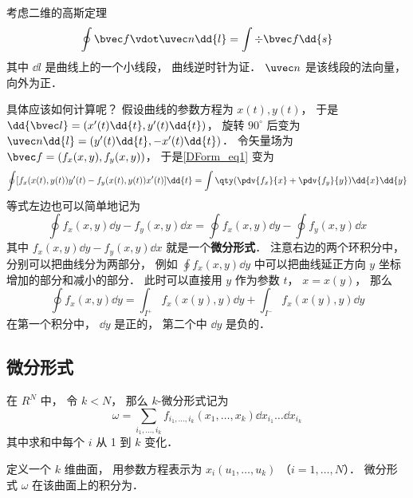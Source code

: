 
\begin{issues}
\issueDraft
\end{issues}


考虑二维的高斯定理
\begin{equation}\label{DForm_eq1}
\oint \bvec f \vdot \uvec n \dd{l} = \int \div \bvec f \dd{s}
\end{equation}
其中 $\dd{l}$ 是曲线上的一个小线段， 曲线逆时针为证． $\uvec n$ 是该线段的法向量， 向外为正．

具体应该如何计算呢？ 假设曲线的参数方程为 $x(t), y(t)$， 于是 $\dd{\bvec l} = (x'(t)\dd{t}, y'(t)\dd{t})$， 旋转 $90^\circ$ 后变为 $\uvec n \dd{l} = (y'(t)\dd{t}, -x'(t)\dd{t})$． 令矢量场为 $\bvec f = (f_x(x,y), f_y(x,y))$， 于是\autoref{DForm_eq1} 变为
\begin{equation}
\oint [f_x(x(t),y(t)) y'(t) - f_y(x(t),y(t)) x'(t)]\dd{t}
= \int \qty(\pdv{f_x}{x} + \pdv{f_y}{y}) \dd{x}\dd{y}
\end{equation}
等式左边也可以简单地记为
\begin{equation}
\oint f_x(x,y) \dd{y} - f_y(x,y) \dd{x} = \oint f_x(x,y) \dd{y} - \oint f_y(x,y) \dd{x}
\end{equation}
其中 $f_x(x,y) \dd{y} - f_y(x,y) \dd{x}$ 就是一个\textbf{微分形式}． 注意右边的两个环积分中， 分别可以把曲线分为两部分， 例如 $\oint f_x(x,y) \dd{y}$ 中可以把曲线延正方向 $y$ 坐标增加的部分和减小的部分． 此时可以直接用 $y$ 作为参数 $t$， $x = x(y)$， 那么
\begin{equation}
\oint f_x(x,y) \dd{y} = \int_{I^+} f_x(x(y),y) \dd{y} + \int_{I^-} f_x(x(y),y) \dd{y}
\end{equation}
在第一个积分中， $\dd{y}$ 是正的， 第二个中 $\dd{y}$ 是负的．

\subsection{微分形式}
在 $R^N$ 中， 令 $k < N$， 那么 $k$-微分形式记为
\begin{equation}
\omega = \sum_{i_1,\dots,i_k} f_{i_1,\dots,i_k}(x_1,\dots,x_k) \dd{x_{i_1}}\dots\dd{x_{i_k}}
\end{equation}
其中求和中每个 $i$ 从 1 到 $k$ 变化．

定义一个 $k$ 维曲面， 用参数方程表示为 $x_i(u_1,\dots,u_k)$ （$i=1,\dots,N$）． 微分形式 $\omega$ 在该曲面上的积分为．
